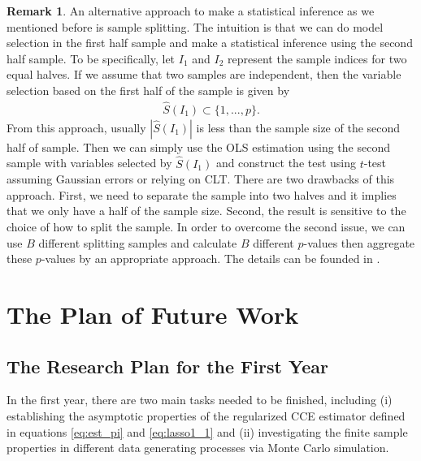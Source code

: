 \documentclass[11pt,a4paper]{article}
\theoremstyle{definition}
\newtheorem{Remark}{Remark}%
\begin{document}
\begin{Remark}
An alternative approach to make a statistical inference as we mentioned before is sample splitting. The intuition is that we can do model selection in the first half sample and make a statistical inference using the second half sample.  To be specifically, let $I_1$ and $I_2$ represent the sample indices for two equal halves. If we assume that two samples are independent, then the variable selection based on the first half of the sample is given by
\begin{align}
\hat{S}(I_1)\subset\{1,...,p\}.
\end{align}
From this approach, usually $|\hat{S}(I_1)|$ is less than the sample size of the second half of sample. Then we can simply use the OLS estimation using the second sample with variables selected by $\hat{S}(I_1)$ and construct the test using $t$-test assuming Gaussian errors or relying on CLT. There are two drawbacks of this approach. First, we need to separate the sample into two halves and it implies that we only have a half of the sample size.  Second, the result is sensitive to the choice of how to split the sample. In order to overcome the second issue, we can use $B$ different splitting samples and calculate $B$ different $p$-values then aggregate these $p$-values by an appropriate approach. The details can be founded in \citet{Wasserman2009}.
\end{Remark}




\section{The Plan of Future Work}

\subsection{The Research Plan for the First Year}
In the first year, there are two main tasks needed to be finished, including (i) establishing the asymptotic properties of the regularized CCE estimator defined in equations \eqref{eq:est_pi} and \eqref{eq:lasso1_1} and (ii) investigating the finite sample properties in different data generating processes via Monte Carlo simulation.
\end{document}
